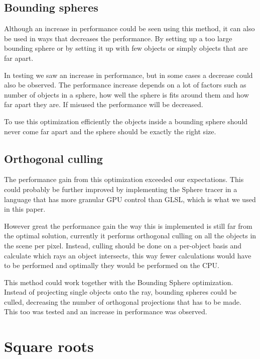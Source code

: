 		\subsection{Bounding spheres}

			Although an increase in performance could be seen using this
			method, it can also be used in ways that decreases the performance.
			By setting up a too large bounding sphere or by setting it up with
			few objects or simply objects that are far apart.

			In testing we saw an increase in performance, but in some cases a
			decrease could also be observed. The performance increase depends
			on a lot of factors such as number of objects in a sphere, how well
			the sphere is fits around them and how far apart they are. If
			misused the performance will be decreased.

			To use this optimization efficiently the objects inside a bounding
			sphere should never come far apart and the sphere should be exactly
			the right size.

		\subsection{Orthogonal culling}

			The performance gain from this optimization exceeded our 
			expectations. This could probably be further improved by 
			implementing the Sphere tracer in a language that has more granular 
			GPU control than GLSL, which is what we used in this paper.

			However great the performance gain the way this is implemented is
			still far from the optimal solution, currently it performs
			orthogonal culling on all the objects in the scene per pixel.
			Instead, culling should be done on a per-object basis and calculate
			which rays an object intersects, this way fewer calculations would
			have to be performed and optimally they would be performed on the
			CPU.

			This method could work together with the Bounding Sphere
			optimization. Instead of projecting single objects onto the ray,
			bounding spheres could be culled, decreasing the number of
			orthogonal projections that has to be made. This too was tested and
			an increase in performance was observed.

	\section{Square roots}

